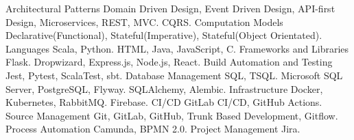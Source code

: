   \begin{cvskills}
    \cvskill
      {Architectural Patterns} 
      { Domain Driven Design, Event Driven Design, API-first Design, Microservices, REST, MVC.}
    \cvskill
      {} 
      { CQRS.}
    \cvskill
      {Computation Models} 
      { Declarative(Functional), Stateful(Imperative), Stateful(Object Orientated).} 
    \cvskill
      {Languages} 
      { Scala, Python.}
    \cvskill
      {} 
      {  HTML, Java, JavaScript, C.}
    \cvskill
      {Frameworks and Libraries} 
      { Flask.}
    \cvskill
      {} 
      { Dropwizard, Express.js, Node.js, React.}
    \cvskill
      {Build Automation and Testing} 
      { Jest, Pytest, ScalaTest, sbt.} 
    \cvskill
      {Database Management} 
      { SQL, TSQL.}
    \cvskill
      {} 
      { Microsoft SQL Server, PostgreSQL, Flyway.}
    \cvskill
      {} 
      { SQLAlchemy, Alembic.}
    \cvskill
      {Infrastructure} 
      { Docker, Kubernetes, RabbitMQ.} 
    \cvskill
      {} 
      { Firebase.} 
    \cvskill
      {CI/CD} 
      { GitLab CI/CD, GitHub Actions.} 
    \cvskill
      {Source Management} 
      { Git, GitLab, GitHub, Trunk Based Development, Gitflow.} 
    \cvskill
      {Process Automation}
      { Camunda, BPMN 2.0.}
    \cvskill
      {Project Management} 
      { Jira.} 
  \end{cvskills}
